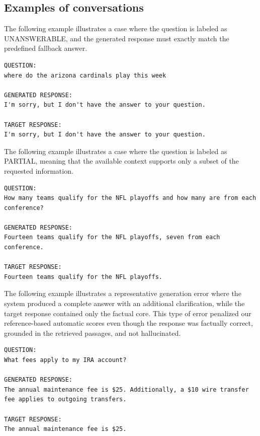 \documentclass[11pt]{article}
\begin{document}
\subsection{Examples of conversations }

The following example illustrates a case where the question is labeled as UNANSWERABLE, and the generated response must exactly match the predefined fallback answer.

\begin{lstlisting}[basicstyle=\scriptsize\ttfamily, breaklines=true, frame=single, numbers=none]
QUESTION:
where do the arizona cardinals play this week

GENERATED RESPONSE:
I'm sorry, but I don't have the answer to your question.

TARGET RESPONSE:
I'm sorry, but I don't have the answer to your question.
\end{lstlisting}

The following example illustrates a case where the question is labeled as PARTIAL, meaning that the available context supports only a subset of the requested information.

\begin{lstlisting}[basicstyle=\scriptsize\ttfamily, breaklines=true, frame=single, numbers=none]
QUESTION:
How many teams qualify for the NFL playoffs and how many are from each conference?

GENERATED RESPONSE:
Fourteen teams qualify for the NFL playoffs, seven from each conference.

TARGET RESPONSE:
Fourteen teams qualify for the NFL playoffs.
\end{lstlisting}

The following example illustrates a representative generation error where the system produced a complete answer with an additional clarification, while the target response contained only the factual core. This type of error penalized our reference-based automatic scores even though the response was factually correct, grounded in the retrieved passages, and not hallucinated.

\begin{lstlisting}[basicstyle=\scriptsize\ttfamily, breaklines=true, frame=single, numbers=none]
QUESTION:
What fees apply to my IRA account?

GENERATED RESPONSE:
The annual maintenance fee is $25. Additionally, a $10 wire transfer fee applies to outgoing transfers.

TARGET RESPONSE:
The annual maintenance fee is $25.
\end{lstlisting}

\label{sec:appendix}
\end{document}
